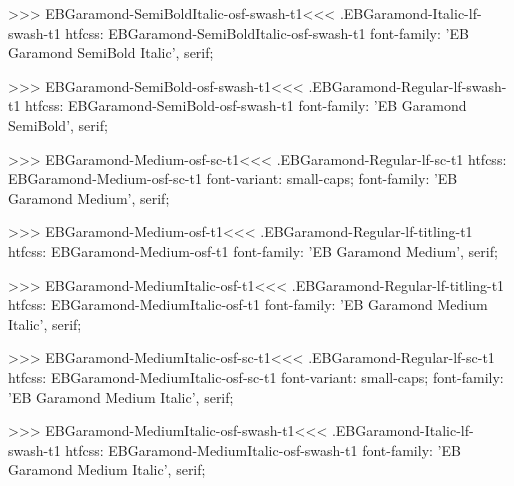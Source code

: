 {{{{{{{>>>
\<EBGaramond-SemiBoldItalic-osf-swash-t1\><<<
.EBGaramond-Italic-lf-swash-t1
htfcss:  EBGaramond-SemiBoldItalic-osf-swash-t1  font-family: 'EB Garamond SemiBold Italic', serif;

>>>
\<EBGaramond-SemiBold-osf-swash-t1\><<<
.EBGaramond-Regular-lf-swash-t1
htfcss:  EBGaramond-SemiBold-osf-swash-t1  font-family: 'EB Garamond SemiBold', serif;

>>>
\<EBGaramond-Medium-osf-sc-t1\><<<
.EBGaramond-Regular-lf-sc-t1
htfcss:  EBGaramond-Medium-osf-sc-t1  font-variant: small-caps; font-family: 'EB Garamond Medium', serif;

>>>
\<EBGaramond-Medium-osf-t1\><<<
.EBGaramond-Regular-lf-titling-t1
htfcss:  EBGaramond-Medium-osf-t1  font-family: 'EB Garamond Medium', serif;

>>>
\<EBGaramond-MediumItalic-osf-t1\><<<
.EBGaramond-Regular-lf-titling-t1
htfcss:  EBGaramond-MediumItalic-osf-t1  font-family: 'EB Garamond Medium Italic', serif;

>>>
\<EBGaramond-MediumItalic-osf-sc-t1\><<<
.EBGaramond-Regular-lf-sc-t1
htfcss:  EBGaramond-MediumItalic-osf-sc-t1  font-variant: small-caps; font-family: 'EB Garamond Medium Italic', serif;

>>>
\<EBGaramond-MediumItalic-osf-swash-t1\><<<
.EBGaramond-Italic-lf-swash-t1
htfcss:  EBGaramond-MediumItalic-osf-swash-t1  font-family: 'EB Garamond Medium Italic', serif;

}}}}}}}
